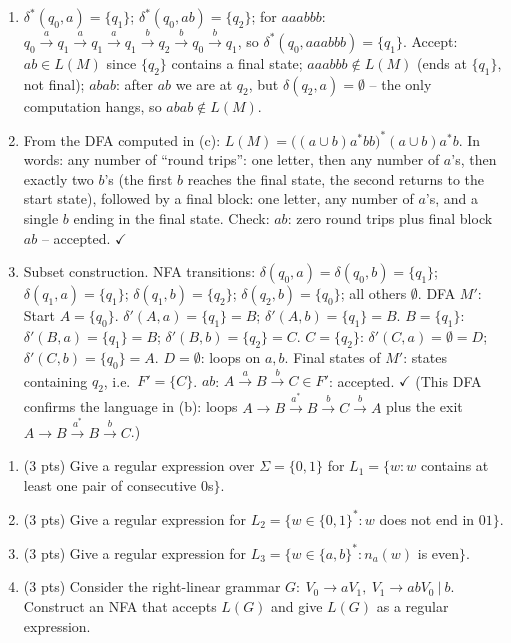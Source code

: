\documentclass[11pt,a4paper]{article}
\newcounter{prob}
\newenvironment{problem}[1][]{%
  \refstepcounter{prob}%
  \begin{tcolorbox}[enhanced,breakable,colback=white,colframe=SteelBlue!70!black,
      boxrule=0.8pt,arc=1.5mm,left=5pt,right=5pt,top=3pt,bottom=3pt,
      before skip=8pt,after skip=8pt,
      title={\textbf{Question \theprob\ (#1)}},fonttitle=\bfseries, coltitle=white,
      colbacktitle=SteelBlue!70!black, boxed title style={arc=1mm}]}
{\end{tcolorbox}}
\newenvironment{solution}{%
  \begin{tcolorbox}[enhanced,breakable,colback=Honeydew!55,colframe=ForestGreen!60!black,
      boxrule=0.6pt,arc=1.5mm,left=5pt,right=5pt,top=3pt,bottom=3pt,
      before skip=6pt,after skip=10pt,
      title={\textbf{Solution \theprob}},fonttitle=\bfseries, coltitle=white,
      colbacktitle=ForestGreen!60!black, boxed title style={arc=1mm}]}
{\end{tcolorbox}}
\newcommand{\ok}{\ensuremath{\checkmark}}
\begin{document}
\begin{solution}
\begin{enumerate}[label=(\alph*)]
  \item $\delta^*(q_0,a)=\{q_1\}$;
  $\delta^*(q_0,ab)=\{q_2\}$;
  for $aaabbb$: $q_0\overset{a}{\to}q_1\overset{a}{\to}q_1\overset{a}{\to}q_1\overset{b}{\to}q_2\overset{b}{\to}q_0\overset{b}{\to}q_1$,
  so $\delta^*(q_0,aaabbb)=\{q_1\}$.
  Accept: $ab\in L(M)$ since $\{q_2\}$ contains a final state;
  $aaabbb\notin L(M)$ (ends at $\{q_1\}$, not final);
  $abab$: after $ab$ we are at $q_2$, but $\delta(q_2,a)=\emptyset$
  -- the only computation hangs, so $abab\notin L(M)$.
  \item From the DFA computed in (c):
  $L(M)=\big((a\cup b)a^*bb\big)^*(a\cup b)a^*b$.
  In words: any number of ``round trips'': one letter, then any
  number of $a$'s, then exactly two $b$'s (the first $b$ reaches the
  final state, the second returns to the start state), followed by a
  final block: one letter, any number of $a$'s, and a single $b$
  ending in the final state.
  Check: $ab$: zero round trips plus final block $ab$ -- accepted. \ok
  \item Subset construction. NFA transitions: $\delta(q_0,a)=\delta(q_0,b)=\{q_1\}$; $\delta(q_1,a)=\{q_1\}$; $\delta(q_1,b)=\{q_2\}$; $\delta(q_2,b)=\{q_0\}$; all others $\emptyset$. DFA $M'$:
  Start $A=\{q_0\}$.
  $\delta'(A,a)=\{q_1\}=B$; $\delta'(A,b)=\{q_1\}=B$.
  $B=\{q_1\}$: $\delta'(B,a)=\{q_1\}=B$; $\delta'(B,b)=\{q_2\}=C$.
  $C=\{q_2\}$: $\delta'(C,a)=\emptyset=D$; $\delta'(C,b)=\{q_0\}=A$.
  $D=\emptyset$: loops on $a,b$.
  Final states of $M'$: states containing $q_2$, i.e.\ $F'=\{C\}$.
  $ab$: $A\overset{a}{\to}B\overset{b}{\to}C\in F'$: accepted. \ok
  (This DFA confirms the language in (b): loops $A\to B\overset{a^*}{\longrightarrow}B\overset{b}{\to}C\overset{b}{\to}A$
  plus the exit $A\to B\overset{a^*}{\longrightarrow}B\overset{b}{\to}C$.)
\end{enumerate}
\end{solution}

\begin{problem}[Regular Expressions and Regular Grammars -- 12 points]
\begin{enumerate}[label=(\alph*)]
  \item (3 pts) Give a regular expression over $\Sigma=\{0,1\}$ for
  $L_1=\{w: w$ contains at least one pair of consecutive 0s$\}$.
  \item (3 pts) Give a regular expression for
  $L_2=\{w\in\{0,1\}^*: w$ does not end in $01\}$.
  \item (3 pts) Give a regular expression for
  $L_3=\{w\in\{a,b\}^*: n_a(w)$ is even$\}$.
  \item (3 pts) Consider the right-linear grammar
  $G:\ V_0\to aV_1,\ V_1\to abV_0\ |\ b$. Construct an NFA that accepts
  $L(G)$ and give $L(G)$ as a regular expression.
\end{enumerate}
\end{problem}
\end{document}
